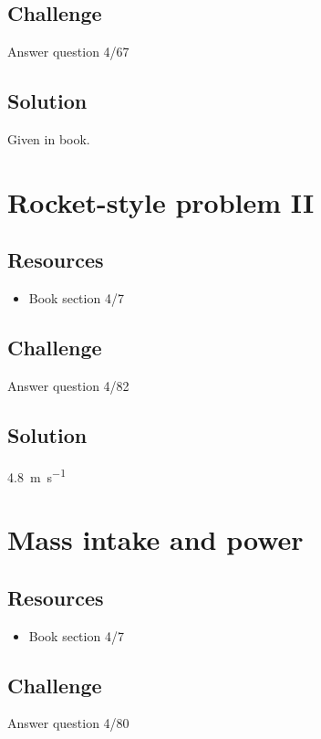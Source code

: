 \subsection*{Challenge}
Answer question 4/67

\subsection*{Solution}
Given in book.




\newpage
\section{Rocket-style problem II}

\subsection*{Resources}
\begin{itemize}
    \item Book section 4/7
\end{itemize}

\subsection*{Challenge}
Answer question 4/82

\subsection*{Solution}
\SI{4.8}{\meter\per\second}




\newpage
\section{Mass intake and power}

\subsection*{Resources}
\begin{itemize}
    \item Book section 4/7
\end{itemize}

\subsection*{Challenge}
Answer question 4/80

